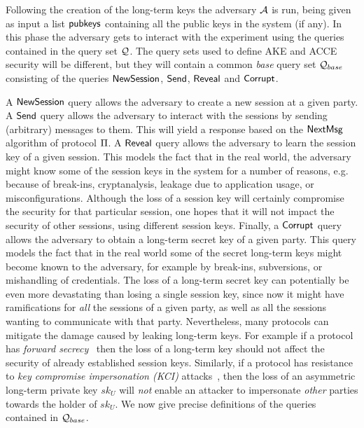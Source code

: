 Following the creation of the long-term keys the adversary $\mathcal{A}$ is run,
being given as input a list $\mathsf{pubkeys}$ containing all the public keys in the system (if any).
In this phase the adversary gets to interact with the experiment using the queries contained in the query set $\mathcal{Q}$.
The query sets used to define AKE and ACCE security will be different,
but they will contain a common \emph{base} query set $\mathcal{Q}_{base}$ consisting of the queries $\mathsf{NewSession}$, $\mathsf{Send}$, $\mathsf{Reveal}$ and $\mathsf{Corrupt}$.

A $\mathsf{NewSession}$ query allows the adversary to create a new session at a given party.
A  $\mathsf{Send}$ query allows the adversary to interact with the sessions by sending (arbitrary) messages to them.
This will yield a response based on the $\mathsf{NextMsg}$ algorithm of protocol $\mathrm{\Pi}$.
A $\mathsf{Reveal}$ query allows the adversary to learn the session key of a given session.
This models the fact that in the real world,
the adversary might know some of the session keys in the system for a number of reasons,
e.g. because of break-ins,
cryptanalysis,
leakage due to application usage, or misconfigurations.
Although the loss of a session key will certainly compromise the security for that particular session,
one hopes that it will not impact the security of other sessions,
using different session keys. 
Finally,
a $\mathsf{Corrupt}$ query allows the adversary to obtain a long-term secret key of a given party.
This query models the fact that in the real world some of the secret long-term keys might become known to the adversary,
for example by break-ins,
subversions, 
or mishandling of credentials.
The loss of a long-term secret key can potentially be even more devastating than losing a single session key,
since now it might have ramifications for \emph{all} the sessions of a given party,
as well as all the sessions wanting to communicate with that party.
Nevertheless,
many protocols can mitigate the damage caused by leaking long-term keys.
For example if a protocol has \emph{forward secrecy}~\cite[p.~496]{MenVanVan96}
then the loss of a long-term key should not affect the security of already established session keys.
Similarly,
if a protocol has resistance to \emph{key compromise impersonation (KCI)} attacks~\cite{AC:JusVau96,Blake-WilsonM:1997:BR93_asymmetric},
then the loss of an asymmetric long-term private key $sk_U$ will \emph{not} enable an attacker to impersonate \emph{other} parties towards the holder of $sk_U$. We now give precise definitions of the queries contained in $\mathcal{Q}_{base}$.





